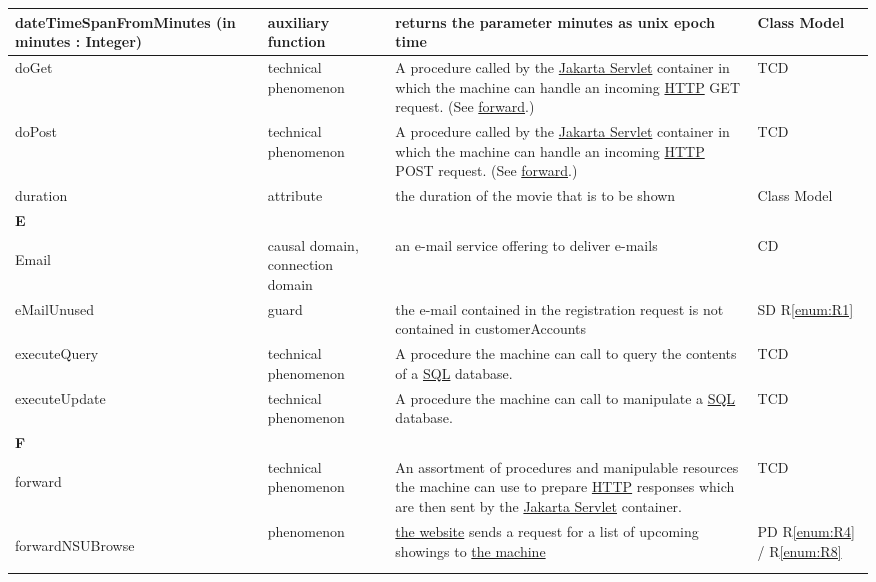 \documentclass[a4paper,10pt,titlepage,bibtotoc,bibtotocnumbered]{scrreprt}
\begin{document}
\begin{longtable}{|p{4cm}|p{3cm}|p{5cm}|l|}
\hline
dateTimeSpanFromMinutes (in minutes : Integer) & auxiliary function & returns the parameter minutes as unix epoch time & Class Model\\
\hline
doGet & technical phenomenon & A procedure called by the \href{https://jakarta.ee/specifications/servlet/}{Jakarta Servlet} container in which the machine can handle an incoming \href{https://datatracker.ietf.org/doc/html/rfc9112}{HTTP} GET request. (See \hyperlink{glossary:forward}{forward}.) & TCD\\
\hline
doPost & technical phenomenon & A procedure called by the \href{https://jakarta.ee/specifications/servlet/}{Jakarta Servlet} container in which the machine can handle an incoming \href{https://datatracker.ietf.org/doc/html/rfc9112}{HTTP} POST request. (See \hyperlink{glossary:forward}{forward}.) & TCD\\
\hline
duration & attribute & the duration of the movie that is to be shown & Class Model\\
\hline
\multicolumn{4}{|l|}{\textbf{E}}\\
\hline
\hypertarget{glossary:Email}{Email} & causal domain, connection domain & an e-mail service offering to deliver e-mails & CD\\
\hline
eMailUnused & guard & the e-mail contained in the registration request is not contained in customerAccounts & SD R\ref{enum:R1}\\
\hline
executeQuery & technical phenomenon & A procedure the machine can call to query the contents of a \href{https://www.mysql.com/products/enterprise/techspec.html}{SQL} database. & TCD\\
\hline
executeUpdate & technical phenomenon & A procedure the machine can call to manipulate a \href{https://www.mysql.com/products/enterprise/techspec.html}{SQL} database. & TCD\\
\hline
\multicolumn{4}{|l|}{\textbf{F}}\\
\hline
\hypertarget{glossary:forward}{forward} & technical phenomenon & An assortment of procedures and manipulable resources the machine can use to prepare \href{https://datatracker.ietf.org/doc/html/rfc9112}{HTTP} responses which are then sent by the \href{https://jakarta.ee/specifications/servlet/}{Jakarta Servlet} container. & TCD\\
\hline
\hypertarget{glossary:forwardNSUBrowse}{forwardNSUBrowse} & phenomenon & \hyperlink{glossary:WebPageNonStaffUserBrowse}{the website} sends a request for a list of upcoming showings to \hyperlink{glossary:UDEK-NonStaffUserBrowse}{the machine} & PD R\ref{enum:R4} / R\ref{enum:R8}\\

\end{longtable}
\end{document}
